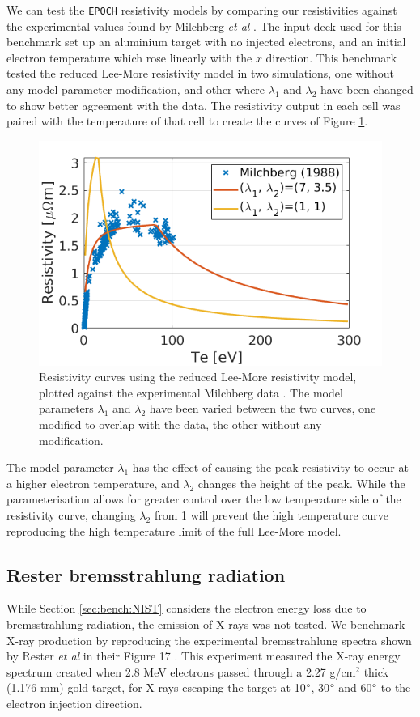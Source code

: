 \documentclass[12pt]{article}
\numberwithin{equation}{section}
\begin{document}
We can test the \texttt{EPOCH} resistivity models by comparing our resistivities against the experimental values found by Milchberg \textit{et al} \cite{eta:Al:Milchberg}. The input deck used for this benchmark set up an aluminium target with no injected electrons, and an initial electron temperature which rose linearly with the $x$ direction. This benchmark tested the reduced Lee-More resistivity model in two simulations, one without any model parameter modification, and other where $\lambda_1$ and $\lambda_2$ have been changed to show better agreement with the data. The resistivity output in each cell was paired with the temperature of that cell to create the curves of Figure \ref{fig:bench:Milchberg}.

\begin{figure}
\centering
  \includegraphics[width=0.6\linewidth]{Figures/bench_milchberg.png}
\caption{Resistivity curves using the reduced Lee-More resistivity model, plotted against the experimental Milchberg data \cite{eta:Al:Milchberg}. The model parameters $\lambda_1$ and $\lambda_2$ have been varied between the two curves, one modified to overlap with the data, the other without any modification.}
\label{fig:bench:Milchberg}
\end{figure}

The model parameter $\lambda_1$ has the effect of causing the peak resistivity to occur at a higher electron temperature, and $\lambda_2$ changes the height of the peak. While the parameterisation allows for greater control over the low temperature side of the resistivity curve, changing $\lambda_2$ from 1 will prevent the high temperature curve reproducing the high temperature limit of the full Lee-More model.

\subsection{Rester bremsstrahlung radiation} \label{sec:bench:Rester}

While Section \ref{sec:bench:NIST} considers the electron energy loss due to bremsstrahlung radiation, the emission of X-rays was not tested. We benchmark X-ray production by reproducing the experimental bremsstrahlung spectra shown by Rester \textit{et al} in their Figure 17 \cite{benchmark:Rester}. This experiment measured the X-ray energy spectrum created when 2.8 MeV electrons passed through a 2.27 g/$\text{cm}^2$ thick (1.176 mm) gold target, for X-rays escaping the target at 10$\degree$, 30$\degree$ and 60$\degree$ to the electron injection direction.
\end{document}
